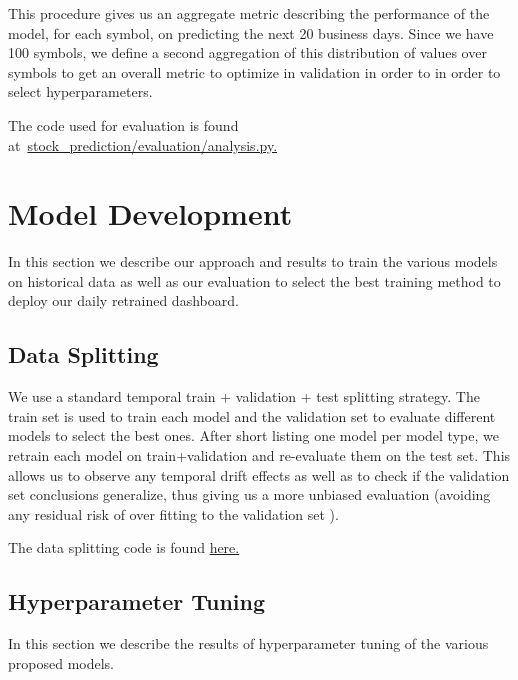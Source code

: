 \documentclass[10pt]{article}
\begin{document}
This procedure gives us an aggregate metric describing the performance
of the model, for each symbol, on predicting the next 20 business days.
Since we have 100 symbols, we define a second aggregation of this
distribution of values over symbols to get an overall metric to optimize
in validation in order to in order to select hyperparameters.~

The code used for evaluation is found
at~\href{https://github.com/marcoopsampaio/aws_ml_eng_project_stock_prediction/blob/main/stock_prediction/evaluation/analysis.py}{stock\_prediction/evaluation/analysis.py.}

\section{Model Development}

{\label{106179}}

In this section we describe our approach and results to train the
various models on historical data as well as our evaluation to select
the best training method to deploy our daily retrained dashboard.

\subsection{Data Splitting}

{\label{261812}}

We use a standard temporal train + validation + test splitting strategy.
The train set is used to train each model and the validation set to
evaluate different models to select the best ones. After short listing
one model per model type, we retrain each model on train+validation and
re-evaluate them on the test set. This allows us to observe any temporal
drift effects as well as to check if the validation set conclusions
generalize, thus giving us a more unbiased evaluation (avoiding any
residual risk of over fitting to the validation set ).

The data splitting code is found
\href{https://github.com/marcoopsampaio/aws_ml_eng_project_stock_prediction/blob/main/stock_prediction/etl/ticker_data_extractors.py\#L58}{here.}

\subsection{Hyperparameter Tuning}

{\label{566600}}

In this section we describe the results of hyperparameter tuning of the
various proposed models.~
\end{document}
